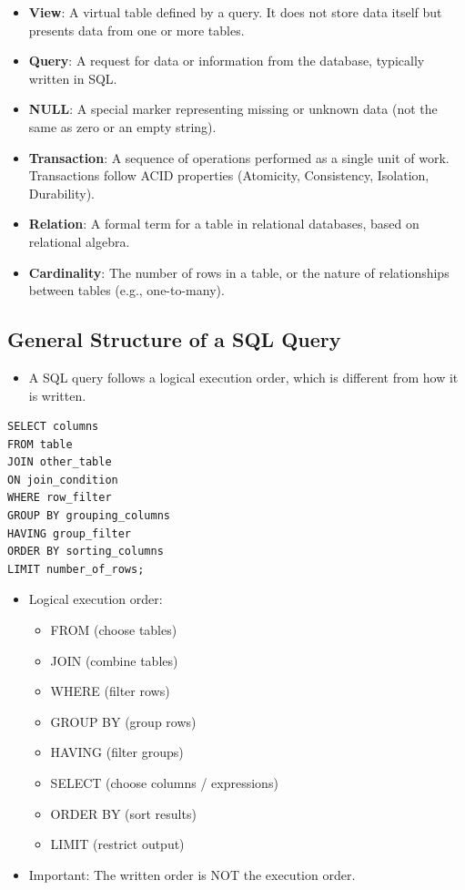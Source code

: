 \documentclass[10pt]{article}
\begin{document}
\begin{itemize}
\item \textbf{View}: A virtual table defined by a query. It does not store data itself but presents data from one or more tables.

\item \textbf{Query}: A request for data or information from the database, typically written in SQL.

\item \textbf{NULL}: A special marker representing missing or unknown data (not the same as zero or an empty string).

\item \textbf{Transaction}: A sequence of operations performed as a single unit of work. Transactions follow ACID properties (Atomicity, Consistency, Isolation, Durability).

\item \textbf{Relation}: A formal term for a table in relational databases, based on relational algebra.

\item \textbf{Cardinality}: The number of rows in a table, or the nature of relationships between tables (e.g., one-to-many).

\end{itemize}

\newpage

\subsection{General Structure of a SQL Query}
\begin{itemize}
\item A SQL query follows a logical execution order, which is different from how it is written.
\end{itemize}

\begin{verbatim}
SELECT columns
FROM table
JOIN other_table
ON join_condition
WHERE row_filter
GROUP BY grouping_columns
HAVING group_filter
ORDER BY sorting_columns
LIMIT number_of_rows;
\end{verbatim}

\begin{itemize}
\item Logical execution order:
    \begin{itemize}
    \item FROM (choose tables)
    \item JOIN (combine tables)
    \item WHERE (filter rows)
    \item GROUP BY (group rows)
    \item HAVING (filter groups)
    \item SELECT (choose columns / expressions)
    \item ORDER BY (sort results)
    \item LIMIT (restrict output)
    \end{itemize}
\item Important: The written order is NOT the execution order.
\end{itemize}
\end{document}
